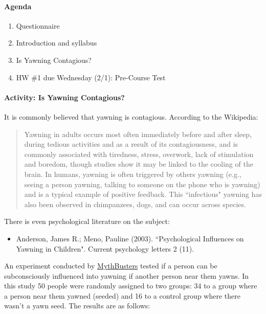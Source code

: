 \documentclass[10pt]{article}\usepackage[]{graphicx}\usepackage[]{color}
\begin{document}
\paragraph{Agenda}
\begin{enumerate}
  \itemsep0em
  \item Questionnaire
  \item Introduction and syllabus
  \item Is Yawning Contagious?
  \item HW \#1 due Wednesday (2/1): Pre-Course Test
\end{enumerate}

\paragraph{Activity: Is Yawning Contagious?}

It is commonly believed that yawning is contagious. According to the Wikipedia:
\begin{quotation}
Yawning in adults occurs most often immediately before and after sleep, during tedious activities and as a result of its contagiousness, and is commonly associated with tiredness, stress, overwork, lack of stimulation and boredom, though studies show it may be linked to the cooling of the brain. In humans, yawning is often triggered by others yawning (e.g., seeing a person yawning, talking to someone on the phone who is yawning) and is a typical example of positive feedback. This ``infectious" yawning has also been observed in chimpanzees, dogs, and can occur across species.
\end{quotation}
There is even psychological literature on the subject:
\begin{itemize}
  \item Anderson, James R.; Meno, Pauline (2003). ``Psychological Influences on Yawning in Children". Current psychology letters 2 (11).
\end{itemize}

An experiment conducted by \href{http://www.discovery.com/tv-shows/mythbusters/videos/is-yawning-contagious-minimyth/}{MythBusters} tested if a person can be subconsciously influenced into yawning if another person near them yawns. 
In this study 50 people were randomly assigned to two groups: 34 to a group where a person near them yawned (seeded) and 16 to a control group where there wasn't a yawn seed. The results are as follows:
\end{document}
